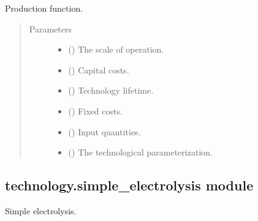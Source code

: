 \documentclass[letterpaper,10pt,english]{sphinxmanual}
\begin{document}
\begin{fulllineitems}
\label{\detokenize{doc-src/technology:technology.pv_residential_simple.production}}
Production function.
\begin{quote}\begin{description}
\item[{Parameters}] \leavevmode\begin{itemize}
\item {} 
 () \textendash{} The scale of operation.

\item {} 
 () \textendash{} Capital costs.

\item {} 
 () \textendash{} Technology lifetime.

\item {} 
 () \textendash{} Fixed costs.

\item {} 
 () \textendash{} Input quantities.

\item {} 
 () \textendash{} The technological parameterization.

\end{itemize}

\end{description}\end{quote}

\end{fulllineitems}



\subsection{technology.simple\_electrolysis module}
\label{\detokenize{doc-src/technology:module-technology.simple_electrolysis}}\label{\detokenize{doc-src/technology:technology-simple-electrolysis-module}}
Simple electrolysis.
\end{document}
